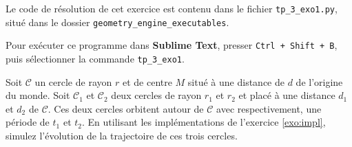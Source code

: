 \documentclass[a4paper,12pt]{article}
\begin{document}
Le code de résolution de cet exercice est contenu dans le fichier \texttt{tp\_3\_exo1.py}, situé dans le dossier \texttt{geometry\_engine\_executables}.

Pour exécuter ce programme dans \textbf{Sublime Text}, presser \texttt{Ctrl + Shift + B}, puis sélectionner la commande \texttt{tp\_3\_exo1}.

\newpage


Soit $\mathcal{C}$ un cercle de rayon $r$ et de centre $M$ situé à une distance de $d$ de l'origine du monde. Soit $\mathcal{C}_1$ et $\mathcal{C}_2$ deux cercles de rayon $r_1$ et $r_2$ et placé à une distance $d_1$ et $d_2$ de $\mathcal{C}$. Ces deux cercles orbitent autour de $\mathcal{C}$ avec respectivement, une période de $t_1$ et $t_2$.
En utilisant les implémentations de l'exercice \ref{exo:impl}, simulez l'évolution de la trajectoire de ces trois cercles.
\end{document}
